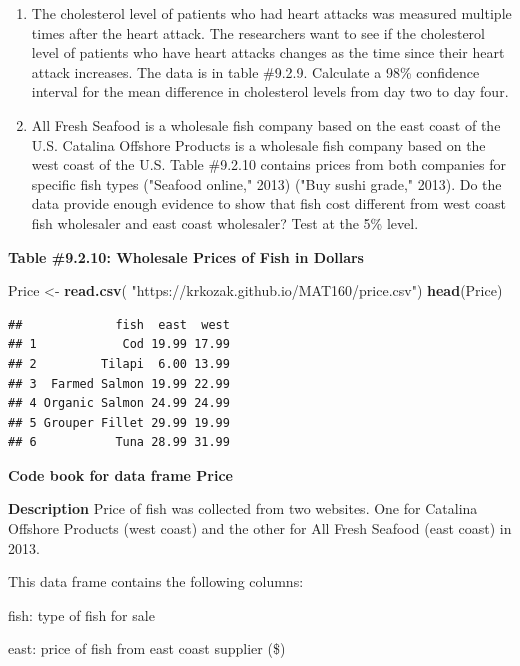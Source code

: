 \documentclass[
]{book}
\newenvironment{Shaded}{\begin{snugshade}}{\end{snugshade}}
\newcommand{\KeywordTok}[1]{\textcolor[rgb]{0.13,0.29,0.53}{\textbf{#1}}}
\newcommand{\NormalTok}[1]{#1}
\newcommand{\StringTok}[1]{\textcolor[rgb]{0.31,0.60,0.02}{#1}}
\begin{document}
\begin{enumerate}
\def\labelenumi{\arabic{enumi}.}
\setcounter{enumi}{1}
\item
  The cholesterol level of patients who had heart attacks was measured multiple times after the heart attack. The researchers want to see if the cholesterol level of patients who have heart attacks changes as the time since their heart attack increases. The data is in table \#9.2.9. Calculate a 98\% confidence interval for the mean difference in cholesterol levels from day two to day four.
\item
  All Fresh Seafood is a wholesale fish company based on the east coast of the U.S. Catalina Offshore Products is a wholesale fish company based on the west coast of the U.S. Table \#9.2.10 contains prices from both companies for specific fish types ("Seafood online," 2013) ("Buy sushi grade," 2013). Do the data provide enough evidence to show that fish cost different from west coast fish wholesaler and east coast wholesaler? Test at the 5\% level.
\end{enumerate}

\textbf{Table \#9.2.10: Wholesale Prices of Fish in Dollars}

\begin{Shaded}
\begin{Highlighting}[]
\NormalTok{ Price <-}\StringTok{ }\KeywordTok{read.csv}\NormalTok{(}
   \StringTok{"https://krkozak.github.io/MAT160/price.csv"}\NormalTok{)}
\KeywordTok{head}\NormalTok{(Price)}
\end{Highlighting}
\end{Shaded}

\begin{verbatim}
##             fish  east  west
## 1            Cod 19.99 17.99
## 2         Tilapi  6.00 13.99
## 3  Farmed Salmon 19.99 22.99
## 4 Organic Salmon 24.99 24.99
## 5 Grouper Fillet 29.99 19.99
## 6           Tuna 28.99 31.99
\end{verbatim}

\textbf{Code book for data frame Price}

\textbf{Description}
Price of fish was collected from two websites. One for Catalina Offshore Products (west coast) and the other for All Fresh Seafood (east coast) in 2013.

This data frame contains the following columns:

fish: type of fish for sale

east: price of fish from east coast supplier (\$)
\end{document}
